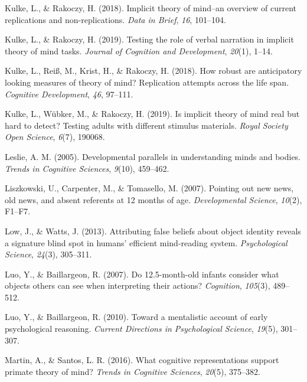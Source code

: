 \documentclass[
  man,floatsintext]{apa6}
\newlength{\cslhangindent}
\newenvironment{CSLReferences}[2] %
 {\begin{list}{}{%
  \setlength{\itemindent}{0pt}
  \setlength{\leftmargin}{0pt}
  \setlength{\parsep}{0pt}
  \ifodd #1
   \setlength{\leftmargin}{\cslhangindent}
   \setlength{\itemindent}{-1\cslhangindent}
  \fi
  \setlength{\itemsep}{#2\baselineskip}}}
 {\end{list}}
\begin{document}
\begin{CSLReferences}{1}{0}
Kulke, L., \& Rakoczy, H. (2018). Implicit theory of mind--an overview of current replications and non-replications. \emph{Data in Brief}, \emph{16}, 101--104.

Kulke, L., \& Rakoczy, H. (2019). Testing the role of verbal narration in implicit theory of mind tasks. \emph{Journal of Cognition and Development}, \emph{20}(1), 1--14.

Kulke, L., Reiß, M., Krist, H., \& Rakoczy, H. (2018). How robust are anticipatory looking measures of theory of mind? Replication attempts across the life span. \emph{Cognitive Development}, \emph{46}, 97--111.

Kulke, L., Wübker, M., \& Rakoczy, H. (2019). Is implicit theory of mind real but hard to detect? Testing adults with different stimulus materials. \emph{Royal Society Open Science}, \emph{6}(7), 190068.

Leslie, A. M. (2005). Developmental parallels in understanding minds and bodies. \emph{Trends in Cognitive Sciences}, \emph{9}(10), 459--462.

Liszkowski, U., Carpenter, M., \& Tomasello, M. (2007). Pointing out new news, old news, and absent referents at 12 months of age. \emph{Developmental Science}, \emph{10}(2), F1--F7.

Low, J., \& Watts, J. (2013). Attributing false beliefs about object identity reveals a signature blind spot in humans' efficient mind-reading system. \emph{Psychological Science}, \emph{24}(3), 305--311.

Luo, Y., \& Baillargeon, R. (2007). Do 12.5-month-old infants consider what objects others can see when interpreting their actions? \emph{Cognition}, \emph{105}(3), 489--512.

Luo, Y., \& Baillargeon, R. (2010). Toward a mentalistic account of early psychological reasoning. \emph{Current Directions in Psychological Science}, \emph{19}(5), 301--307.

Martin, A., \& Santos, L. R. (2016). What cognitive representations support primate theory of mind? \emph{Trends in Cognitive Sciences}, \emph{20}(5), 375--382.


\end{CSLReferences}
\end{document}
